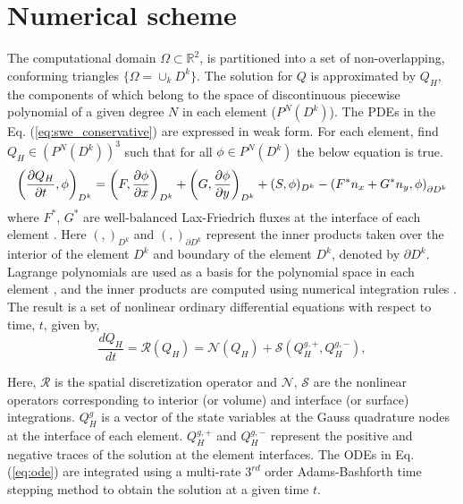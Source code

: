 \section{Numerical scheme}
\label{sec:discretization}
The computational domain   $\Omega \subset \mathbb{R}^2$, is partitioned into a set of non-overlapping, conforming triangles $\{ \Omega = \displaystyle\cup_{k} D^{k} \}$. The solution for $Q$ is approximated by $Q_H$, the components of which belong to the space of discontinuous piecewise polynomial of a given degree $N$ in each element ($P^{N}(D^{k})$). The PDEs in the Eq. (\ref{eq:swe_conservative}) are expressed in weak form. For each element, find $Q_H \in (P^{N}(D^{k}))^{3}$ such that for all $\phi \in P^{N}(D^{k})$ the below equation is true.
\begin{equation}
\left( \frac{\partial Q_{H}}{\partial t} , \phi \right)_{D^{k}} = \left( F, \frac{\partial \phi}{\partial x}\right)_{D^{k}} + \left( G, \frac{\partial \phi}{\partial y} \right)_{D^{k}} + (S, \phi)_{D^{k}} - \left(F^* n_x + G^* n_y,  \phi\right)_{\partial D^{k}}
\end{equation}
where $F^*$, $G^*$ are well-balanced Lax-Friedrich fluxes at the interface of each element \cite{xing2010positivity}. Here $(,)_{D^k}$ and $(,)_{\partial D^k}$ represent the inner products taken over the interior of the element $D^k$ and boundary of the element $D^k$, denoted by $\partial D^k$. Lagrange polynomials are used as a basis for the polynomial space in each element \cite{hesthaven2008nodal}, and the inner products are computed using numerical integration rules \cite{cools1999monomial}. The result is  a set of nonlinear ordinary differential equations with respect to time, $t$, given by,
\begin{equation}
\label{eq:ode}
\frac{d Q_{H}}{dt} = \mathcal{R}(Q_{H}) = \mathcal{N}(Q_{H}) + \mathcal{S}(Q_{H}^{g,+},Q_{H}^{g,-}),
\end{equation}

Here, $\mathcal{R}$  is the spatial discretization operator and $\mathcal{N}$, $\mathcal{S}$ are the nonlinear operators corresponding to interior (or volume) and interface (or surface) integrations. $Q_{H}^{g}$ is a vector of  the state variables at the Gauss quadrature nodes at the interface of each element. $Q_{H} ^{g,+}$ and $Q_{H}^{g,-}$ represent the positive and negative traces of the solution at the element interfaces. The ODEs  in  Eq. (\ref{eq:ode}) are integrated using a multi-rate $3^{rd}$ order Adams-Bashforth time stepping method to obtain the solution at a given time $t$.

